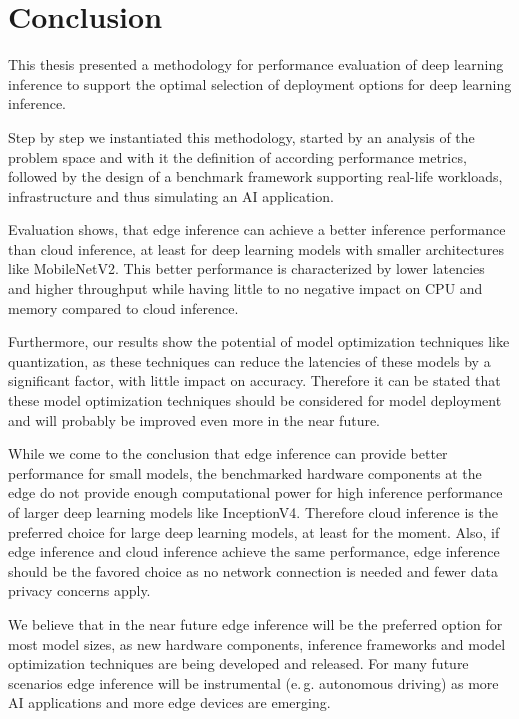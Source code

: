 \chapter{Conclusion}
\label{chap:conclusion}

This thesis presented a methodology for performance evaluation of deep learning inference to support the optimal selection of deployment options for deep learning inference.

Step by step we instantiated this methodology, started by an analysis of the problem space and with it the definition of according performance metrics, followed by the design of a benchmark framework supporting real-life workloads, infrastructure and thus simulating an AI application.

Evaluation shows, that edge inference can achieve a better inference performance than cloud inference, at least for deep learning models with smaller architectures like MobileNetV2.
This better performance is characterized by lower latencies and higher throughput while having little to no negative impact on CPU and memory compared to cloud inference.

Furthermore, our results show the potential of model optimization techniques like quantization, as these techniques can reduce the latencies of these models by a significant factor, with little impact on accuracy.
Therefore it can be stated that these model optimization techniques should be considered for model deployment and will probably be improved even more in the near future.

While we come to the conclusion that edge inference can provide better performance for small models, the benchmarked hardware components at the edge do not provide enough computational power for high inference performance of larger deep learning models like InceptionV4.
Therefore cloud inference is the preferred choice for large deep learning models, at least for the moment.
Also, if edge inference and cloud inference achieve the same performance, edge inference should be the favored choice as no network connection is needed and fewer data privacy concerns apply.

We believe that in the near future edge inference will be the preferred option for most model sizes, as new hardware components, inference frameworks and model optimization techniques are being developed and released.
For many future scenarios edge inference will be instrumental (e.\,g. autonomous driving) as more AI applications and more edge devices are emerging.


